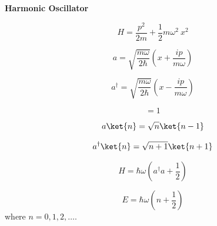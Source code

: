 {\bf Harmonic Oscillator}

\begin{equation}
H = \frac{p^2}{2m} + \frac{1}{2} m \omega^2 \: x^2
\end{equation}

\begin{equation}
a = \sqrt{\frac{m\omega}{2\hbar}} \left( x+\frac{ip}{m\omega} \right)
\end{equation}

\begin{equation}
a^{\dagger} = \sqrt{\frac{m\omega}{2\hbar}} \left( x-\frac{ip}{m\omega} \right)
\end{equation}

\begin{equation}
[\:a, a^{\dagger}] = 1
\end{equation}

\begin{equation}
a \ket{n} = \sqrt{n} \ket{n-1}
\end{equation}

\begin{equation}
a^{\dagger} \ket{n} = \sqrt{n+1} \ket{n+1}
\end{equation}

\begin{equation}
H = \hbar\omega(a^{\dagger}a+\frac{1}{2})
\end{equation}

\begin{equation}
E = \hbar\omega(n+\frac{1}{2})
\end{equation}
where $n=0,1,2,\ldots$.
